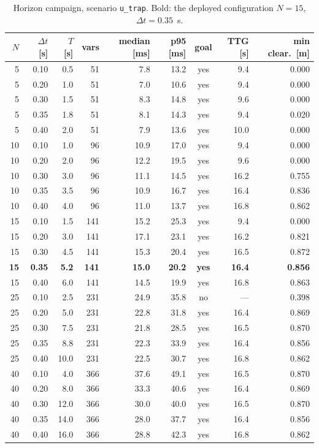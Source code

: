 \begin{table}[htbp]
  \centering
  \small
  \caption{Horizon campaign, scenario \texttt{u\_trap}. Bold: the deployed configuration $N=15$, $\Delta t=0.35$~s.}
  \label{res:tab:horizon:utrap}
  \begin{tabular}{rrrrrrcrr}
    \toprule
    $N$ & $\Delta t$ [s] & $T$ [s] & vars & median [ms] & p95 [ms] & goal & TTG [s] & min clear.\ [m] \\
    \midrule
    5 & 0.10 & 0.5 & 51 & 7.8 & 13.2 & yes & 9.4 & 0.000 \\
    5 & 0.20 & 1.0 & 51 & 7.0 & 10.6 & yes & 9.4 & 0.000 \\
    5 & 0.30 & 1.5 & 51 & 8.3 & 14.8 & yes & 9.6 & 0.000 \\
    5 & 0.35 & 1.8 & 51 & 8.1 & 14.3 & yes & 9.4 & 0.020 \\
    5 & 0.40 & 2.0 & 51 & 7.9 & 13.6 & yes & 10.0 & 0.000 \\
    10 & 0.10 & 1.0 & 96 & 10.9 & 17.0 & yes & 9.4 & 0.000 \\
    10 & 0.20 & 2.0 & 96 & 12.2 & 19.5 & yes & 9.6 & 0.000 \\
    10 & 0.30 & 3.0 & 96 & 11.1 & 14.5 & yes & 16.2 & 0.755 \\
    10 & 0.35 & 3.5 & 96 & 10.9 & 16.7 & yes & 16.4 & 0.836 \\
    10 & 0.40 & 4.0 & 96 & 11.0 & 13.7 & yes & 16.8 & 0.862 \\
    15 & 0.10 & 1.5 & 141 & 15.2 & 25.3 & yes & 9.4 & 0.000 \\
    15 & 0.20 & 3.0 & 141 & 17.1 & 23.1 & yes & 16.2 & 0.821 \\
    15 & 0.30 & 4.5 & 141 & 15.3 & 20.4 & yes & 16.5 & 0.872 \\
    \textbf{15} & \textbf{0.35} & \textbf{5.2} & \textbf{141} & \textbf{15.0} & \textbf{20.2} & \textbf{yes} & \textbf{16.4} & \textbf{0.856} \\
    15 & 0.40 & 6.0 & 141 & 14.5 & 19.9 & yes & 16.8 & 0.863 \\
    25 & 0.10 & 2.5 & 231 & 24.9 & 35.8 & no & --- & 0.398 \\
    25 & 0.20 & 5.0 & 231 & 22.8 & 31.8 & yes & 16.4 & 0.869 \\
    25 & 0.30 & 7.5 & 231 & 21.8 & 28.5 & yes & 16.5 & 0.870 \\
    25 & 0.35 & 8.8 & 231 & 22.3 & 33.9 & yes & 16.4 & 0.856 \\
    25 & 0.40 & 10.0 & 231 & 22.5 & 30.7 & yes & 16.8 & 0.862 \\
    40 & 0.10 & 4.0 & 366 & 37.6 & 49.1 & yes & 16.5 & 0.870 \\
    40 & 0.20 & 8.0 & 366 & 33.3 & 40.6 & yes & 16.4 & 0.869 \\
    40 & 0.30 & 12.0 & 366 & 30.0 & 40.0 & yes & 16.5 & 0.870 \\
    40 & 0.35 & 14.0 & 366 & 28.0 & 37.7 & yes & 16.4 & 0.856 \\
    40 & 0.40 & 16.0 & 366 & 28.8 & 42.3 & yes & 16.8 & 0.862 \\
    \bottomrule
  \end{tabular}
\end{table}

